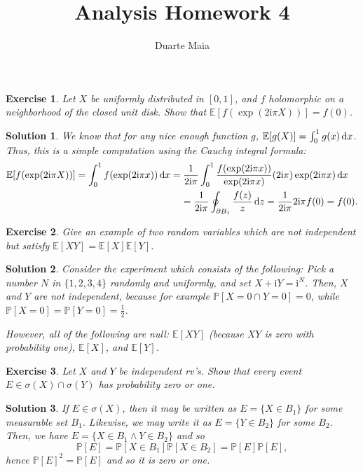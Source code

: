 \documentclass{article}
\title{Analysis Homework 4}
\author{Duarte Maia}
\newtheorem{ex}{Exercise}
\theoremstyle{nonumberplain}
\newtheorem{sol}{Solution}
\newcommand{\I}{\mathrm{i}}
\newcommand{\EV}{\mathbb{E}}
\newcommand{\PP}{\mathbb{P}}
\begin{document}
\maketitle

\begin{ex}
Let $X$ be uniformly distributed in $[0,1]$, and $f$ holomorphic on a neighborhood of the closed unit disk. Show that $\EV[f(\exp(2 \I \pi X))] = f(0)$.
\end{ex}

\begin{sol}
We know that for any nice enough function $g$, $\EV[g(X)] = \int_0^1 g(x) \dl x$. Thus, this is a simple computation using the Cauchy integral formula:
\begin{equation}
\begin{multlined}
\EV[f(\exp(2 \I \pi X))] = \int_0^1 f(\exp(2 \I \pi x)) \dl x = \frac1{2\I \pi} \int_0^1 \frac{f(\exp(2 \I \pi x))}{\exp(2 \I \pi x)} (2 \I \pi) \exp(2 \I \pi x) \dl x \\
= \frac1{2 \I \pi} \oint_{\partial B_1} \frac{f(z)}z \dl z = \frac1{2 \I \pi} 2 \I \pi f(0) = f(0).
\end{multlined}
\end{equation}
\end{sol}

\begin{ex}
Give an example of two random variables which are not independent but satisfy $\EV[XY] = \EV[X] \EV[Y]$.
\end{ex}

\begin{sol}
Consider the experiment which consists of the following: Pick a number $N$ in $\{1,2,3,4\}$ randomly and uniformly, and set $X + \I Y = \I^N$. Then, $X$ and $Y$ are not independent, because for example $\PP[X = 0 \cap Y = 0] = 0$, while $\PP[X = 0] = \PP[Y = 0] = \frac12$.

However, all of the following are null: $\EV[XY]$ (because $XY$ is zero with probability one), $\EV[X]$, and $\EV[Y]$.
\end{sol}

\begin{ex}
Let $X$ and $Y$ be independent rv's. Show that every event $E \in \sigma(X) \cap \sigma(Y)$ has probability zero or one.
\end{ex}

\begin{sol}
If $E \in \sigma(X)$, then it may be written as $E =\{X \in B_1\}$ for some measurable set $B_1$. Likewise, we may write it as $E = \{Y \in B_2\}$ for some $B_2$. Then, we have $E = \{X \in B_1 \land Y \in B_2\}$ and so
\begin{equation}
\PP[E] = \PP[X \in B_1] \PP[X \in B_2] = \PP[E] \PP[E],
\end{equation}
hence $\PP[E]^2 = \PP[E]$ and so it is zero or one.
\end{sol}
\end{document}
